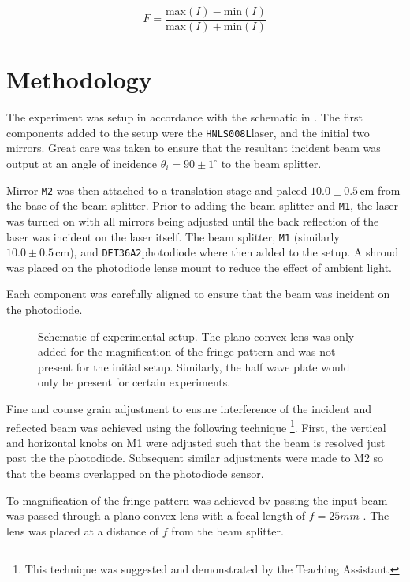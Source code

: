 \documentclass[aip, cp, amsmath, amssymb, reprint]{revtex4-2}
\newcommand{\pdiode}{\texttt{DET36A2}\space}
\newcommand{\hene}{\texttt{HNLS008L}\space}
\begin{document}
        \begin{equation} \label{eqn:fringe-vis}
            F = \frac{\text{max}(I) - \text{min}(I)}{\text{max}(I) + \text{min}(I)}
        \end{equation}

    \section{Methodology}
        The experiment was setup in accordance with the schematic in . The first components added to the setup were the \hene laser, and the initial two mirrors. Great care was taken to ensure that the resultant incident beam was output at an angle of incidence $\theta_i = 90\pm 1^\circ$ to the beam splitter. 

        Mirror \texttt{M2} was then attached to a translation stage and palced $10.0\pm0.5\,\text{cm}$ from the base of the beam splitter. Prior to adding the beam splitter and \texttt{M1}, the laser was turned on with all mirrors being adjusted until the back reflection of the laser was incident on the laser itself. The beam splitter, \texttt{M1} (similarly $10.0\pm0.5\,\text{cm}$), and \pdiode photodiode where then added to the setup. A shroud was placed on the photodiode lense mount to reduce the effect of ambient light. 
        
        Each component was carefully aligned to ensure that the beam was incident on the photodiode. 

        \begin{figure}[H]
            \centering
            
            \caption{Schematic of experimental setup. The plano-convex lens was only added for the magnification of the fringe pattern and was not present for the initial setup. Similarly, the half wave plate would only be present for certain experiments.}
            \label{fig:setup}
        \end{figure}

        Fine and course grain adjustment to ensure interference of the incident and reflected beam was achieved using the following technique \footnote{This technique was suggested and demonstrated by the Teaching Assistant.}. First, the vertical and horizontal knobs on M1 were adjusted such that the beam is resolved just past the the photodiode. Subsequent similar adjustments were made to M2 so that the beams overlapped on the photodiode sensor.

        To magnification of the fringe pattern was achieved bv passing the input beam was passed through a plano-convex lens with a focal length of $f=25mm$ \cite{thorlabs}. The lens was placed at a distance of $f$ from the beam splitter.
\end{document}
